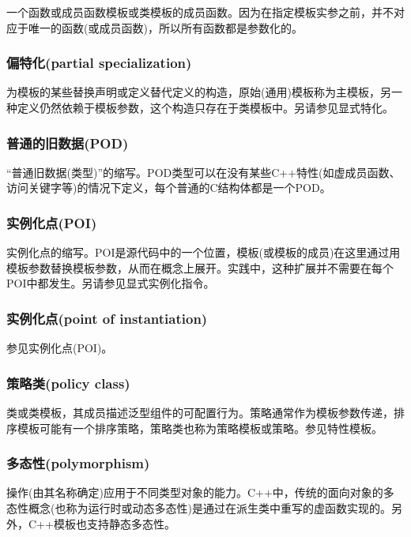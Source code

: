 一个函数或成员函数模板或类模板的成员函数。因为在指定模板实参之前，并不对应于唯一的函数(或成员函数)，所以所有函数都是参数化的。

\subsubsection{偏特化(partial specialization)}

为模板的某些替换声明或定义替代定义的构造，原始(通用)模板称为主模板，另一种定义仍然依赖于模板参数，这个构造只存在于类模板中。另请参见显式特化。

\subsubsection{普通的旧数据(POD)}

“普通旧数据(类型)”的缩写。POD类型可以在没有某些C++特性(如虚成员函数、访问关键字等)的情况下定义，每个普通的C结构体都是一个POD。

\subsubsection{实例化点(POI)}

实例化点的缩写。POI是源代码中的一个位置，模板(或模板的成员)在这里通过用模板参数替换模板参数，从而在概念上展开。实践中，这种扩展并不需要在每个POI中都发生。另请参见显式实例化指令。

\subsubsection{实例化点(point of instantiation)}

参见实例化点(POI)。

\subsubsection{策略类(policy class)}

类或类模板，其成员描述泛型组件的可配置行为。策略通常作为模板参数传递，排序模板可能有一个排序策略，策略类也称为策略模板或策略。参见特性模板。

\subsubsection{多态性(polymorphism)}

操作(由其名称确定)应用于不同类型对象的能力。C++中，传统的面向对象的多态性概念(也称为运行时或动态多态性)是通过在派生类中重写的虚函数实现的。另外，C++模板也支持静态多态性。

